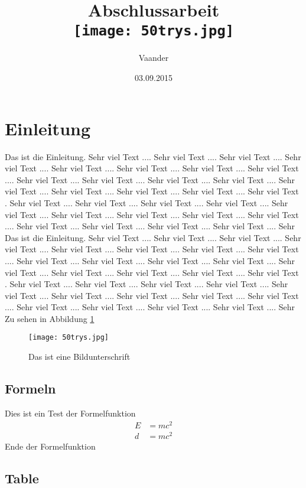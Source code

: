 \documentclass[a4paper,10pt]{scrreprt}
\title{
	Abschlussarbeit\\
	\vspace{5mm}
	\texttt{[image: 50trys.jpg]}	%
}
\author{ Vaander}
\date{03.09.2015}
\begin{document}
\maketitle
\tableofcontents
\newpage 

\section{Einleitung}
Das ist die Einleitung. Sehr viel Text .... Sehr viel Text .... Sehr viel Text .... Sehr viel Text .... Sehr viel Text .... Sehr viel Text .... Sehr viel Text .... Sehr viel Text .... Sehr viel Text .... Sehr viel Text .... Sehr viel Text .... Sehr viel Text .... Sehr viel Text .... Sehr viel Text .... Sehr viel Text .... Sehr viel Text .... Sehr viel Text . Sehr viel Text .... Sehr viel Text .... Sehr  viel Text .... Sehr viel Text .... Sehr viel Text .... Sehr viel Text .... Sehr viel Text .... Sehr viel Text .... Sehr viel Text .... Sehr viel Text .... Sehr viel Text .... Sehr viel Text .... Sehr viel Text .... Sehr 
Das ist die Einleitung. Sehr viel Text .... Sehr viel Text .... Sehr viel Text .... Sehr viel Text .... Sehr viel Text .... Sehr viel Text .... Sehr viel Text .... Sehr viel Text .... Sehr viel Text .... Sehr viel Text .... Sehr viel Text .... Sehr viel Text .... Sehr viel Text .... Sehr viel Text .... Sehr viel Text .... Sehr viel Text .... Sehr viel Text . Sehr viel Text .... Sehr viel Text .... Sehr  viel Text .... Sehr viel Text .... Sehr viel Text .... Sehr viel Text .... Sehr viel Text .... Sehr viel Text .... Sehr viel Text .... Sehr viel Text .... Sehr viel Text .... Sehr viel Text .... Sehr viel Text .... Sehr 
Zu sehen in Abbildung \ref{Bild1}

 
\begin{figure}[h]
\centering\texttt{[image: 50trys.jpg]}
\caption{Das ist eine Bildunterschrift}
\label{Bild1}
\end{figure}


\subsection{Formeln}
Dies ist ein Test der Formelfunktion
\begin{align}
E &= mc^2 \\
d &= mc^2
\end{align}
Ende der Formelfunktion

\subsection{Table}
\end{document}
